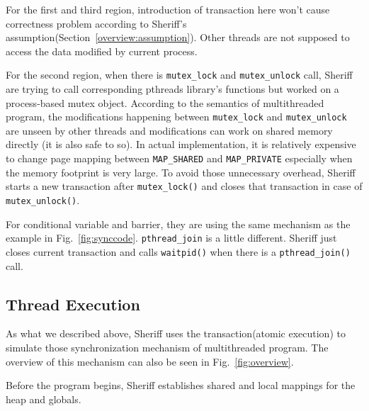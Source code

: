 For the first and third region, introduction of transaction here won't cause correctness problem 
according to Sheriff's assumption(Section~\ref{overview:assumption}). Other threads are not supposed 
to access the data modified by current process.

For the second region, when there is \texttt{mutex\_lock} and \texttt{mutex\_unlock} call, 
Sheriff are trying to call corresponding
pthreads library's functions but worked on a process-based mutex object. 
According to the semantics of multithreaded program, the modifications happening between \texttt{mutex\_lock} 
and \texttt{mutex\_unlock}
are unseen by other threads and modifications can work on shared memory directly (it is also safe to so).  
In actual implementation, it is relatively expensive to 
change page mapping between \texttt{MAP\_SHARED} and \texttt{MAP\_PRIVATE} 
especially when the memory footprint is very large. To avoid those unnecessary overhead, 
Sheriff starts a new transaction after \texttt{mutex\_lock()} and closes that transaction in case of \texttt{mutex\_unlock()}. 

For conditional variable and barrier, they are using the same mechanism as the example in Fig.~\ref{fig:synccode}.
\texttt{pthread\_join} is a little different. Sheriff just closes current transaction and calls \texttt{waitpid()} 
when there is a \texttt{pthread\_join()} call. 

\subsection{Thread Execution}
\label{simulation:thread}
As what we described above, Sheriff uses the transaction(atomic execution) to simulate 
those synchronization mechanism of multithreaded program. 
The overview of this mechanism can also be seen in Fig.~\ref{fig:overview}.
 
Before the program begins, Sheriff establishes shared and local mappings for the heap and globals. 
\begin{comment}
To improve the performance, Sheriff don't do page protection when there is just one thread; read/write operations
work on shared mappings directly to avoid protection overhead and commit overhead. 
We implement this in the following two cases:
First, Sheriff will start page protection until there is a pthread\_create() function call  
to spawn one child. 
Second, Sheriff will close page protection when there is just one thread.
Sheriff always checks whether current thread is the only thread in the system in pthread\_join() function
and close the page protection timely if it is.

To start the protection, those pages in the protection range will be set to MAP\_PRIVATE and PROT\_READ mode; 
later access on one protected page should invoke a Copy-On-Write operation in the operating system.
To stop the protection, those pages in the protection range will be re-set to MAP\_SHARED and readable/writable; later access 
access on those pages will work on shared mapping directly(through mapping file). 
\end{comment}
